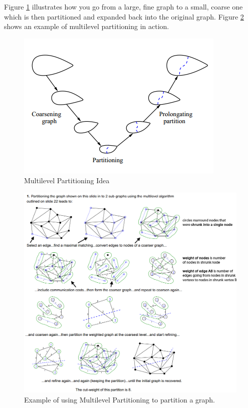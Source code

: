 \documentclass{article}
\begin{document}
Figure \ref{fig:multilevel-partitioning-idea} illustrates how you go from a large, fine graph to a small, coarse one which is then partitioned and expanded back into the original graph. Figure \ref{fig:multilevel-partitioning-example} shows an example of multilevel partitioning in action.

\begin{figure}
	\centering
	\includegraphics[scale=0.8]{figures/multilevel-partioning.png}
	\caption{Multilevel Partitioning Idea}
	\label{fig:multilevel-partitioning-idea}
\end{figure}

\begin{figure}
	\centering
	\includegraphics[scale=0.5]{figures/multilevel-partitioning-example.png}
	\caption{Example of using Multilevel Partitioning to partition a graph.}
	\label{fig:multilevel-partitioning-example}
\end{figure}
\end{document}
